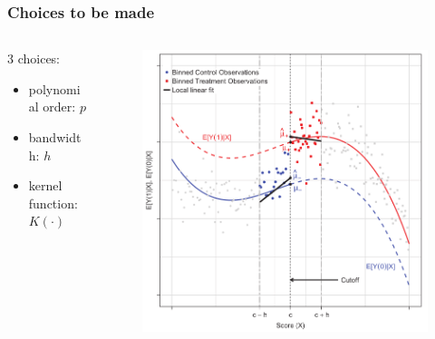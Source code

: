 \documentclass[12pt,english,dvipsnames,aspectratio=169,handout]{beamer}\usepackage[]{graphicx}\usepackage[]{xcolor}
\begin{document}
\begin{frame}
\frametitle{Choices to be made}

\begin{columns}
	\begin{column}{0.3\textwidth}
		3 choices:
		
		\begin{itemize}
		\footnotesize
			\item polynomial order: $p$
			\item bandwidth: $h$
			\item kernel function: $K(\cdot)$
		\end{itemize}
	\end{column}
	\begin{column}{0.7\textwidth}
		\begin{figure}
			\centering
			\includegraphics[scale=0.35]{../04-figures/07/06.PNG}
			\caption{\cite{cattaneo_practical_2019}}
		\end{figure}
	\end{column}
\end{columns}

\end{frame}
\end{document}
